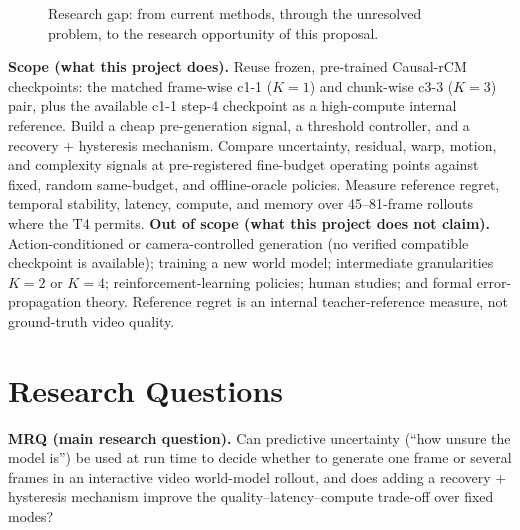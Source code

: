 \documentclass[11pt,a4paper]{article}
\begin{document}
\begin{figure}[t]
\centering

\caption{Research gap: from current methods, through the unresolved problem, to the research opportunity of this proposal.}
\label{fig:gap}
\end{figure}

\textbf{Scope (what this project does).} Reuse frozen, pre-trained Causal-rCM checkpoints: the matched frame-wise c1-1 ($K=1$) and chunk-wise c3-3 ($K=3$) pair, plus the available c1-1 step-4 checkpoint as a high-compute internal reference. Build a cheap pre-generation signal, a threshold controller, and a recovery + hysteresis mechanism. Compare uncertainty, residual, warp, motion, and complexity signals at pre-registered fine-budget operating points against fixed, random same-budget, and offline-oracle policies. Measure reference regret, temporal stability, latency, compute, and memory over 45--81-frame rollouts where the T4 permits. \textbf{Out of scope (what this project does not claim).} Action-conditioned or camera-controlled generation (no verified compatible checkpoint is available); training a new world model; intermediate granularities $K=2$ or $K=4$; reinforcement-learning policies; human studies; and formal error-propagation theory. Reference regret is an internal teacher-reference measure, not ground-truth video quality.

\section{Research Questions}\label{sec:rq}

\textbf{MRQ (main research question).} Can predictive uncertainty (``how unsure the model is'') be used at run time to decide whether to generate one frame or several frames in an interactive video world-model rollout, and does adding a recovery + hysteresis mechanism improve the quality--latency--compute trade-off over fixed modes?
\end{document}
